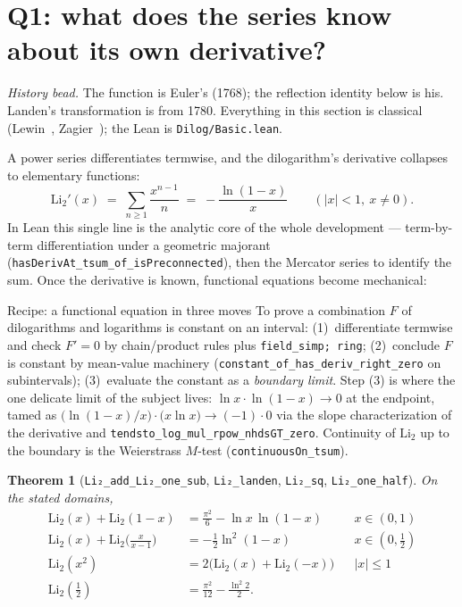\documentclass[11pt]{article}
\newtheorem{theorem}{Theorem}
\newcommand{\lean}[1]{\texttt{#1}}
\newcommand{\Li}{\mathrm{Li}_2}
\begin{document}
\section{Q1: what does the series know about its own derivative?}\label{sec:dilog}

\emph{History bead.} The function is Euler's (1768); the reflection identity below is
his. Landen's transformation is from 1780. Everything in this section is classical
(Lewin~\cite{lewin}, Zagier~\cite{zagier}); the Lean is \lean{Dilog/Basic.lean}.

A power series differentiates termwise, and the dilogarithm's derivative collapses to
elementary functions:
\[
\Li'(x) \;=\; \sum_{n\ge1}\frac{x^{n-1}}{n} \;=\; -\frac{\ln(1-x)}{x}
\qquad(\lvert x\rvert<1,\ x\ne 0).
\]
In Lean this single line is the analytic core of the whole development ---
term-by-term differentiation under a geometric majorant
(\lean{hasDerivAt\_tsum\_of\_isPreconnected}), then the Mercator series to identify the
sum. Once the derivative is known, functional equations become mechanical:

\begin{recipebox}{Recipe: a functional equation in three moves}
To prove a combination $F$ of dilogarithms and logarithms is constant on an interval:
(1)~differentiate termwise and check $F'=0$ by chain/product rules plus
\lean{field\_simp; ring}; (2)~conclude $F$ is constant by mean-value machinery
(\lean{constant\_of\_has\_deriv\_right\_zero} on subintervals); (3)~evaluate the
constant as a \emph{boundary limit}. Step (3) is where the one delicate limit of the
subject lives: $\ln x\cdot\ln(1-x)\to 0$ at the endpoint, tamed as
$\big(\ln(1-x)/x\big)\cdot\big(x\ln x\big)\to(-1)\cdot 0$ via the slope
characterization of the derivative and \lean{tendsto\_log\_mul\_rpow\_nhdsGT\_zero}.
Continuity of $\Li$ up to the boundary is the Weierstrass $M$-test
(\lean{continuousOn\_tsum}).
\end{recipebox}

\begin{theorem}[{\lean{Li₂\_add\_Li₂\_one\_sub}, \lean{Li₂\_landen},
\lean{Li₂\_sq}, \lean{Li₂\_one\_half}}]\label{thm:funceq}
On the stated domains,
\begin{align*}
\Li(x)+\Li(1-x) &= \tfrac{\pi^2}{6}-\ln x\,\ln(1-x) && x\in(0,1)\\
\Li(x)+\Li\!\Big(\tfrac{x}{x-1}\Big) &= -\tfrac{1}{2}\ln^2(1-x) && x\in(0,\tfrac12)\\
\Li(x^2) &= 2\big(\Li(x)+\Li(-x)\big) && \lvert x\rvert\le 1\\
\Li(\tfrac12) &= \tfrac{\pi^2}{12}-\tfrac{\ln^2 2}{2}.
\end{align*}
\end{theorem}
\end{document}
